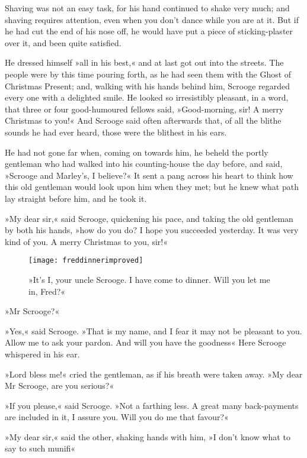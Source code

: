 Shaving was not an easy task, for his hand continued to shake very much; and shaving requires attention, even when you don't dance while you are at it. But if he had cut the end of his nose off, he would have put a piece of sticking-plaster over it, and been quite satisfied.

He dressed himself »all in his best,« and at last got out into the streets. The people were by this time pouring forth, as he had seen them with the Ghost of Christmas Present; and, walking with his hands behind him, Scrooge regarded every one with a delighted smile. He looked so irresistibly pleasant, in a word, that three or four good-humoured fellows said, »Good-morning, sir! A merry Christmas to you!« And Scrooge said often afterwards that, of all the blithe sounds he had ever heard, those were the blithest in his ears.

He had not gone far when, coming on towards him, he beheld the portly gentleman who had walked into his counting-house the day before, and said, »Scrooge and Marley's, I believe?« It sent a pang across his heart to think how this old gentleman would look upon him when they met; but he knew what path lay straight before him, and he took it.

»My dear sir,« said Scrooge, quickening his pace, and taking the old gentleman by both his hands, »how do you do? I hope you succeeded yesterday. It was very kind of you. A merry Christmas to you, sir!«

\begin{figure}[p]
\begin{minipage}[c]{\textwidth}
\texttt{[image: freddinnerimproved]}
\caption[\textbf{»Will you let me in, Fred?«}]{»It's I, your uncle Scrooge. I have come to dinner. Will you let me in, Fred?«}
\end{minipage}
\end{figure}

»Mr Scrooge?«

»Yes,« said Scrooge. »That is my name, and I fear it may not be pleasant to you. Allow me to ask your pardon. And will you have the goodness\longdash« Here Scrooge whispered in his ear.

»Lord bless me!« cried the gentleman, as if his breath were taken away. »My dear Mr Scrooge, are you serious?«

»If you please,« said Scrooge. »Not a farthing less. A great many back-payments are included in it, I assure you. Will you do me that favour?«

»My dear sir,« said the other, shaking hands with him, »I don't know what to say to such munifi\longdash«

